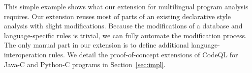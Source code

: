 This simple example shows what our extension for multilingual program analysis
requires. Our extension reuses most of parts of an existing declarative style
analysis with slight modifications. Because the modifications of a database and
language-specific rules is trivial, we can fully automate the modification
process.  The only manual part in our extension is to define additional
language-interoperation rules. We detail the proof-of-concept extensions of
CodeQL for Java-C and Python-C programs in Section~\ref{sec:impl}.



